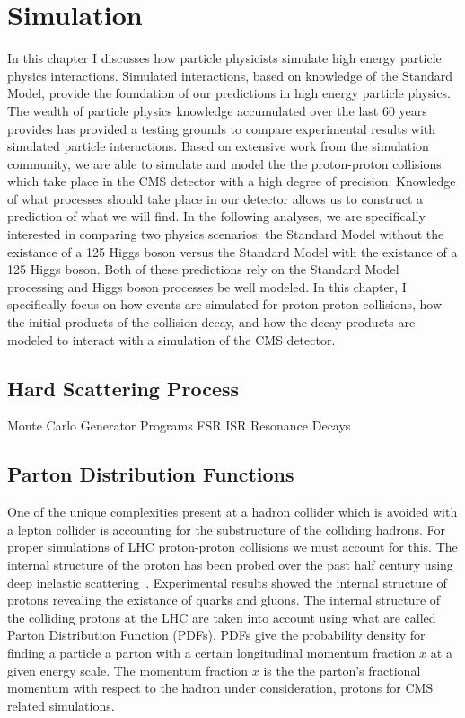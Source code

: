 \chapter{Simulation}
\label{sec:simulation}
In this chapter I discusses how particle physicists simulate high energy particle physics
interactions. Simulated interactions, based on knowledge of the Standard Model, provide 
the foundation of our predictions in high energy particle physics. 
The wealth of particle physics knowledge accumulated over the last 
60 years provides has provided a testing grounds to compare experimental results with
simulated particle interactions. Based on extensive work from the simulation community,
we are able to simulate and model the the proton-proton collisions which take place in the
CMS detector with a high degree of precision. Knowledge of what processes should take place
in our detector allows us to construct a prediction of what we will find. In the following
analyses, we are specifically interested in comparing two physics scenarios: the Standard Model 
without the existance of a 125 \GeV Higgs boson versus the Standard Model with the existance
of a 125 \GeV Higgs boson. Both of these predictions rely on the Standard Model processing and
Higgs boson processes be well modeled.
In this chapter, I specifically focus on how events are simulated for proton-proton collisions,
how the initial products of the collision decay, and how the decay products are modeled
to interact with a simulation of the CMS detector.


\section{Hard Scattering Process}
Monte Carlo Generator Programs
FSR ISR
    Resonance Decays

\section{Parton Distribution Functions}
One of the unique complexities present at a hadron collider which is avoided with a
lepton collider is accounting for the substructure of the colliding hadrons. For proper simulations
of LHC proton-proton collisions we must account for this. The internal structure of the proton
has been probed over the past half century using deep inelastic scattering~\cite{Breidenbach:1969kd, PhysRevLett.23.930}.
Experimental results showed the internal structure of protons revealing the existance of
quarks and gluons. The internal structure of the colliding protons at the LHC are taken into
account using what are called Parton Distribution Function (PDFs). PDFs give the probability
density for finding a particle a parton with a certain longitudinal momentum fraction $x$ at a given
energy scale. The momentum fraction $x$ is the the parton's fractional momentum with respect
to the hadron under consideration, protons for CMS related simulations. 

